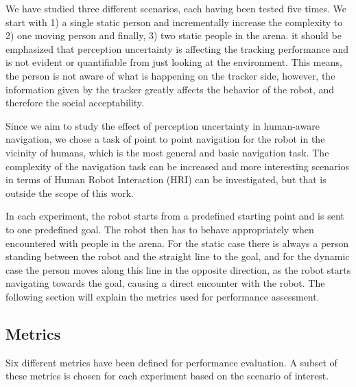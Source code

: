 We have studied three different scenarios, each having been tested five times. We start with 1) a single static person and incrementally increase the complexity to 2) one moving person and finally, 3) two static people in the arena. it should be emphasized that perception uncertainty is affecting the tracking performance and is not evident or quantifiable from just looking at the environment. This means, the person is not aware of what is happening on the tracker side, however, the information given by the tracker greatly affects the behavior of the robot, and therefore the social acceptability. 


Since we aim to study the effect of perception uncertainty in human-aware navigation, we chose a task of point to point navigation for the robot in the vicinity of humans, which is the most general and basic navigation task. The complexity of the navigation task can be increased and more interesting scenarios in terms of Human Robot Interaction (HRI) can be investigated, but that is outside the scope of this work. 

In each experiment, the robot starts from a predefined starting point and is sent to one predefined goal. The robot then has to behave appropriately when encountered with people in the arena. For the static case there is always a person standing between the robot and the straight line to the goal, and for the dynamic case the person moves along this line in the opposite direction, as the robot starts navigating towards the goal, causing a direct encounter with the robot. The following section will explain the metrics used for performance assessment.%

%




\subsection{Metrics}

Six different metrics have been defined for performance evaluation. A subset of these metrics is chosen for each experiment based on the scenario of interest.%



